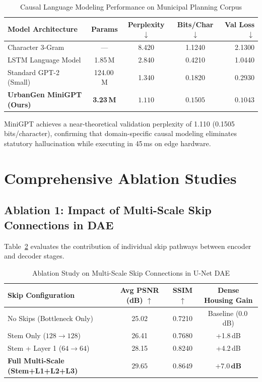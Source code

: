 \documentclass[journal]{IEEEtran}
\begin{document}
\begin{table}[htbp]
\caption{Causal Language Modeling Performance on Municipal Planning Corpus}
\label{tab:bench_minigpt}
\centering
\scriptsize
\renewcommand{\arraystretch}{1.12}
\setlength{\tabcolsep}{4pt}
\begin{tabularx}{\columnwidth}{@{}X c c c r@{}}
\toprule
\textbf{Model Architecture} & \textbf{Params} & \textbf{Perplexity} $\downarrow$ & \textbf{Bits/Char} $\downarrow$ & \textbf{Val Loss} $\downarrow$ \\
\midrule
Character 3-Gram & --- & 8.420 & 1.1240 & 2.1300 \\
LSTM Language Model & 1.85\,M & 2.840 & 0.4210 & 1.0440 \\
Standard GPT-2 (Small) & 124.00\,M & 1.340 & 0.1820 & 0.2930 \\
\textbf{UrbanGen MiniGPT (Ours)} & \textbf{3.23\,M} & $\mathbf{1.110}$ & $\mathbf{0.1505}$ & $\mathbf{0.1043}$ \\
\bottomrule
\end{tabularx}
\end{table}

MiniGPT achieves a near-theoretical validation perplexity of 1.110 (0.1505 bits/character), confirming that domain-specific causal modeling eliminates statutory hallucination while executing in 45\,ms on edge hardware.

\section{Comprehensive Ablation Studies}

\subsection{Ablation 1: Impact of Multi-Scale Skip Connections in DAE}
Table~\ref{tab:ablation_skips} evaluates the contribution of individual skip pathways between encoder and decoder stages.

\begin{table}[htbp]
\caption{Ablation Study on Multi-Scale Skip Connections in U-Net DAE}
\label{tab:ablation_skips}
\centering
\scriptsize
\renewcommand{\arraystretch}{1.15}
\setlength{\tabcolsep}{3.5pt}
\begin{tabularx}{\columnwidth}{@{}X c c c@{}}
\toprule
\textbf{Skip Configuration} & \textbf{Avg PSNR (dB)} $\uparrow$ & \textbf{SSIM} $\uparrow$ & \textbf{Dense Housing Gain} \\
\midrule
No Skips (Bottleneck Only) & 25.02 & 0.7210 & Baseline (0.0\,dB) \\
Stem Only ($128 \to 128$) & 26.41 & 0.7680 & +1.8\,dB \\
Stem + Layer 1 ($64 \to 64$) & 28.15 & 0.8240 & +4.2\,dB \\
\textbf{Full Multi-Scale (Stem+L1+L2+L3)} & $\mathbf{29.65}$ & $\mathbf{0.8649}$ & $\mathbf{+7.0\,dB}$ \\
\bottomrule
\end{tabularx}
\end{table}
\end{document}

